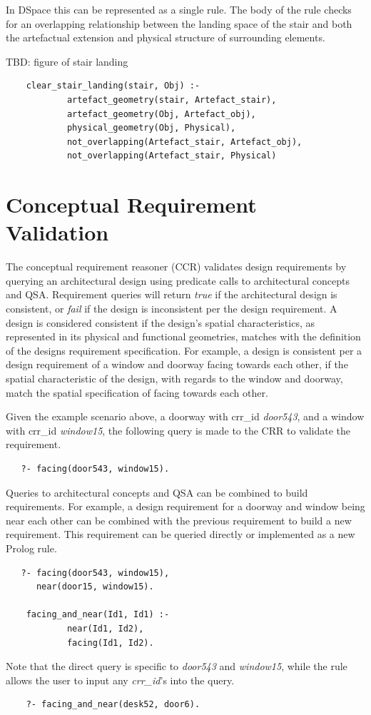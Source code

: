 \documentclass[12pt]{ucthesis}
\begin{document}
In DSpace this can be represented as a single rule. The body of the rule checks for an overlapping relationship between the landing space of the stair and both the artefactual extension and physical structure of surrounding elements.

TBD: figure of stair landing

\begin{verbatim}
    clear_stair_landing(stair, Obj) :- 
            artefact_geometry(stair, Artefact_stair),
            artefact_geometry(Obj, Artefact_obj),
            physical_geometry(Obj, Physical),
            not_overlapping(Artefact_stair, Artefact_obj),
            not_overlapping(Artefact_stair, Physical)
\end{verbatim}  

\section{Conceptual Requirement Validation}
The conceptual requirement reasoner (CCR) validates design requirements by querying an architectural design using predicate calls to architectural concepts and QSA. Requirement queries will return \emph{true} if the architectural design is consistent, or \emph{fail} if the design is inconsistent per the design requirement. A design is considered consistent if the design's spatial characteristics, as represented in its physical and functional geometries, matches with the definition of the designs requirement specification. For example, a design is consistent per a design requirement of a window and doorway facing towards each other, if the spatial characteristic of the design, with regards to the window and doorway, match the spatial specification of facing towards each other.    

Given the example scenario above, a doorway with crr\_id \emph{door543}, and a window with crr\_id \emph{window15}, the following query is made to the CRR to validate the requirement.
\begin{verbatim}
   ?- facing(door543, window15).
\end{verbatim}
Queries to architectural concepts and QSA can be combined to build requirements. For example, a design requirement for a doorway and window being near each other can be combined with the previous requirement to build a new requirement. This requirement can be queried directly or implemented as a new Prolog rule. 
\begin{verbatim}
   ?- facing(door543, window15),
      near(door15, window15).
      
    facing_and_near(Id1, Id1) :-
            near(Id1, Id2),
            facing(Id1, Id2).
\end{verbatim}
Note that the direct query is specific to \emph{door543} and \emph{window15}, while the rule allows the user to input any \emph{crr\_id}'s into the query.
\begin{verbatim}
    ?- facing_and_near(desk52, door6).
\end{verbatim}
\end{document}

